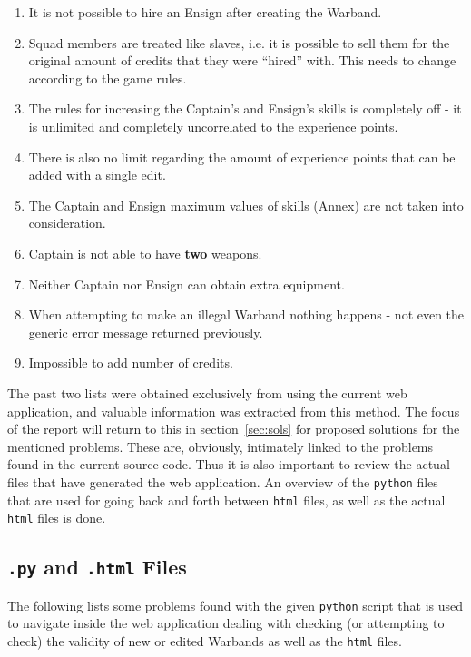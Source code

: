 \documentclass[12pt,a4paper]{article}
\begin{document}
\begin{enumerate}
 \item It is not possible to hire an Ensign after creating the Warband.
 \item Squad members are treated like slaves, i.e. it is possible to sell them for the original amount of credits that they were ``hired'' with. This needs to change according to the game rules.
 \item The rules for increasing the Captain's and Ensign's skills is completely off - it is unlimited and completely uncorrelated to the experience points.
 \item There is also no limit regarding the amount of experience points that can be added with a single edit.
 \item The Captain and Ensign maximum values of skills (Annex) are not taken into consideration.
 \item Captain is not able to have \textbf{two} weapons.
 \item Neither Captain nor Ensign can obtain extra equipment.
 \item When attempting to make an illegal Warband nothing happens - not even the generic error message returned previously.
 \item Impossible to add number of credits.
\end{enumerate}

The past two lists were obtained exclusively from using the current web application, and valuable information was extracted from this method. The focus of the report will return to this in section~\ref{sec:sols} for proposed solutions for the mentioned problems. These are, obviously, intimately linked to the problems found in the current source code. Thus it is also important to review the actual files that have generated the web application. An overview of the \texttt{python} files that are used for going back and forth between \texttt{html} files, as well as the actual \texttt{html} files is done. 

\subsection{\texttt{.py} and \texttt{.html} Files}

The following lists some problems found with the given \texttt{python} script that is used to navigate inside the web application dealing with checking (or attempting to check) the validity of new or edited Warbands as well as the \texttt{html} files.  
\end{document}
